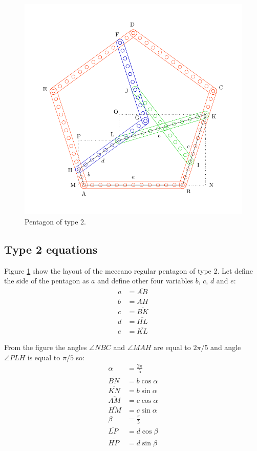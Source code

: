 \documentclass[11pt]{article}
\begin{document}
\begin{figure}[htpb]
\centering
\includegraphics[scale=0.75]{types/2}
\caption{Pentagon of type 2.}
\label{fig:type-2}
\end{figure}

\subsection{Type 2 equations}

Figure \ref{fig:type-2} show the layout of the meccano regular pentagon of type 2.
Let define the side of the pentagon as $a$ and define other four variables $b$, $c$, $d$ and $e$:
\begin{align*}
a &= \overline{AB}\\
b &= \overline{AH}\\
c &= \overline{BK}\\
d &= \overline{HL}\\
e &= \overline{KL}
\end{align*}

From the figure the angles $\angle{NBC}$ and $\angle{MAH}$ are equal to $2\pi / 5$ and
angle $\angle{PLH}$ is equal to $\pi / 5$ so:
\begin{align*}
\alpha &= \frac{2\pi}{5}\\
\overline{BN} &= b\cos{\alpha}\\
\overline{KN} &= b\sin{\alpha}\\
\overline{AM} &= c\cos{\alpha}\\
\overline{HM} &= c\sin{\alpha}\\
\beta &= \frac{\pi}{5}\\
\overline{LP} &= d\cos{\beta}\\
\overline{HP} &= d\sin{\beta}
\end{align*}
\end{document}
